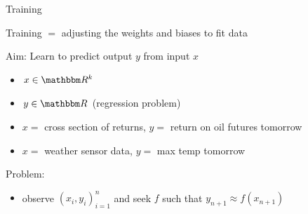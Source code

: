 \begin{frame}{Training}
    
    \begin{figure}
       \centering
    \end{figure}

    Training $=$ adjusting the weights and biases to fit data

\end{frame}


\begin{frame}
    
    Aim: Learn to predict output $y$ from input $x$
    \begin{itemize}
        \item $x \in \RR^k$
        \vspace{0.5em}
        \item $y \in \RR$  (regression problem)
    \end{itemize}

    \Egs
    \begin{itemize}
        \item $x = $ cross section of returns, $y = $ return on oil futures tomorrow
        \vspace{0.5em}
        \item $x = $ weather sensor data, $y = $ max temp tomorrow
    \end{itemize}
        \vspace{0.5em}
        \vspace{0.5em}

    Problem:

    \begin{itemize}
        \item observe $(x_i, y_i)_{i=1}^n$ and seek $f$ such that $y_{n+1}
            \approx f(x_{n+1})$
    \end{itemize}


\end{frame}



